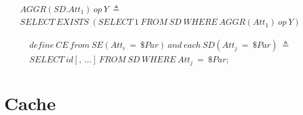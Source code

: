 \begin{align*}%
&AGGR(SD.Att_1)\ op\ Y\ \triangleq\\
&SELECT\ EXISTS\ (SELECT\ 1\ FROM\ SD\ WHERE\ AGGR(Att_1)\ op\ Y)
\end{align*}

\begin{align*}%
&define\ CE\ from\ SE(Att_i\ = \ \$Par)\ and\ each\ SD(Att_j\ = \ \$Par)\ \triangleq\\
&SELECT\ id[,\ ...]\ FROM\ SD\ WHERE\ Att_j\ =\ \$Par;
\end{align*}



\section{Cache}